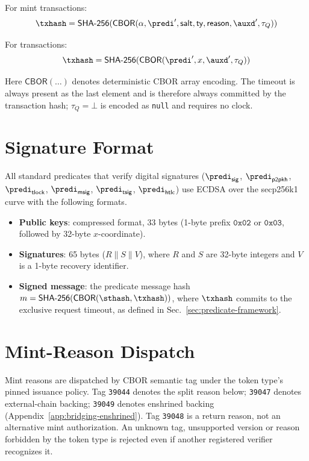 For mint transactions:
\[
\txhash = \mathsf{SHA\text{-}256}(\mathsf{CBOR}(\alpha, \predi', \mathsf{salt}, \mathsf{ty}, \mathsf{reason}, \auxd', \tau_Q))
\]

For transactions:
\[
\txhash = \mathsf{SHA\text{-}256}(\mathsf{CBOR}(\predi', x, \auxd', \tau_Q))
\]

Here $\mathsf{CBOR}(\ldots)$ denotes deterministic CBOR array encoding. The timeout is always present as the last element and is therefore always committed by the transaction hash; $\tau_Q=\bot$ is encoded as \texttt{null} and requires no clock.


\section{Signature Format}\label{app:signature-format}

All standard predicates that verify digital signatures ($\predi_\mathsf{sig}$, $\predi_\mathsf{p2pkh}$, $\predi_\mathsf{tlock}$, $\predi_\mathsf{msig}$, $\predi_\mathsf{tsig}$, $\predi_\mathsf{htlc}$) use ECDSA over the secp256k1 curve with the following formats.

\begin{itemize}
	\item \textbf{Public keys}: compressed format, 33 bytes (1-byte prefix $\texttt{0x02}$ or $\texttt{0x03}$, followed by 32-byte $x$-coordinate).
	\item \textbf{Signatures}: 65 bytes ($R \mathbin{\|} S \mathbin{\|} V$), where $R$ and $S$ are 32-byte integers and $V$ is a 1-byte recovery identifier.
	\item \textbf{Signed message}: the predicate message hash $m = \mathsf{SHA\text{-}256}(\mathsf{CBOR}(\sthash, \txhash))$, where $\txhash$ commits to the exclusive request timeout, as defined in Sec.~\ref{sec:predicate-framework}.
\end{itemize}


\section{Mint-Reason Dispatch}\label{app:mint-reason-dispatch}

Mint reasons are dispatched by CBOR semantic tag under the token type's pinned issuance policy. Tag \texttt{39044} denotes the split reason below; \texttt{39047} denotes external-chain backing; \texttt{39049} denotes enshrined backing (Appendix~\ref{app:bridging-enshrined}). Tag \texttt{39048} is a return reason, not an alternative mint authorization. An unknown tag, unsupported version or reason forbidden by the token type is rejected even if another registered verifier recognizes it.

